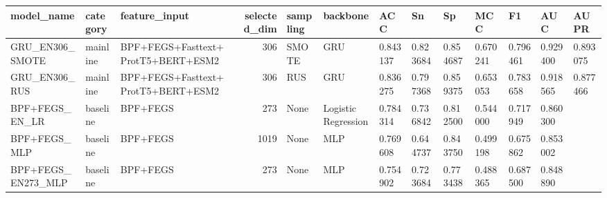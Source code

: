 \begin{tabular}{lllrlllllllll}
\toprule
model_name & category & feature_input & selected_dim & sampling & backbone & ACC & Sn & Sp & MCC & F1 & AUC & AUPR \\
\midrule
GRU_EN306_SMOTE & mainline & BPF+FEGS+Fasttext+ProtT5+BERT+ESM2 & 306 & SMOTE & GRU & 0.843137 & 0.823684 & 0.854687 & 0.670241 & 0.796461 & 0.929400 & 0.893075 \\
GRU_EN306_RUS & mainline & BPF+FEGS+Fasttext+ProtT5+BERT+ESM2 & 306 & RUS & GRU & 0.836275 & 0.797368 & 0.859375 & 0.653053 & 0.783658 & 0.918565 & 0.877466 \\
BPF+FEGS_EN_LR & baseline & BPF+FEGS & 273 & None & Logistic Regression & 0.784314 & 0.736842 & 0.812500 & 0.544000 & 0.717949 & 0.860300 &  \\
BPF+FEGS_MLP & baseline & BPF+FEGS & 1019 & None & MLP & 0.769608 & 0.644737 & 0.843750 & 0.499198 & 0.675862 & 0.853002 &  \\
BPF+FEGS_EN273_MLP & baseline & BPF+FEGS & 273 & None & MLP & 0.754902 & 0.723684 & 0.773438 & 0.488365 & 0.687500 & 0.848890 &  \\
\bottomrule
\end{tabular}
